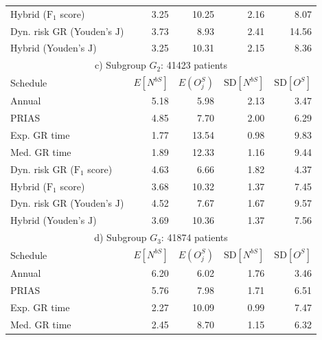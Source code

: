 \begin{table}[!htb]
\begin{tabular}{lrrrr}
Hybrid ($\mbox{F}_1$ score)       & 3.25            & 10.25               & 2.16          & 8.07              \\
Dyn. risk GR (Youden's $\mbox{J}$)      & 3.73            & 8.93                & 2.41          & 14.56            \\
Hybrid (Youden's $\mbox{J}$)   & 3.25            & 10.31                & 2.15          & 8.36              \\
\hline      
\multicolumn{5}{c}{c) Subgroup $G_2$: 41423 patients}\\
\hline
Schedule        & $E[N^{bS}]$ & $E(O^S_j)$ & ${\mbox{SD}[N^{bS}]}$ & ${\mbox{SD}[O^S]}$ \\
\hline
Annual         & 5.18            & 5.98                & 2.13          & 3.47              \\
PRIAS          & 4.85            & 7.70                & 2.00          & 6.29        \\
Exp. GR time & 1.77            & 13.54               & 0.98          & 9.83              \\
Med. GR time & 1.89             & 12.33               & 1.16          & 9.44              \\
Dyn. risk GR ($\mbox{F}_1$ score)       & 4.63            & 6.66                & 1.82          & 4.37              \\
Hybrid ($\mbox{F}_1$ score)       & 3.68            & 10.32                & 1.37          & 7.45              \\
Dyn. risk GR (Youden's $\mbox{J}$)      & 4.52            & 7.67                & 1.67          & 9.57           \\
Hybrid (Youden's $\mbox{J}$)   & 3.69             & 10.36               & 1.37          & 7.56              \\
\hline      
\multicolumn{5}{c}{d) Subgroup $G_3$: 41874 patients}\\
\hline
Schedule        & $E[N^{bS}]$ & $E(O^S_j)$ & ${\mbox{SD}[N^{bS}]}$ & ${\mbox{SD}[O^S]}$ \\
\hline
Annual         & 6.20             & 6.02                & 1.76          & 3.46              \\
PRIAS          & 5.76             & 7.98                & 1.71         & 6.51        \\
Exp. GR time & 2.27            & 10.09               & 0.99          & 7.47              \\
Med. GR time & 2.45            & 8.70                & 1.15          & 6.32              \\

\end{tabular}
\end{table}
